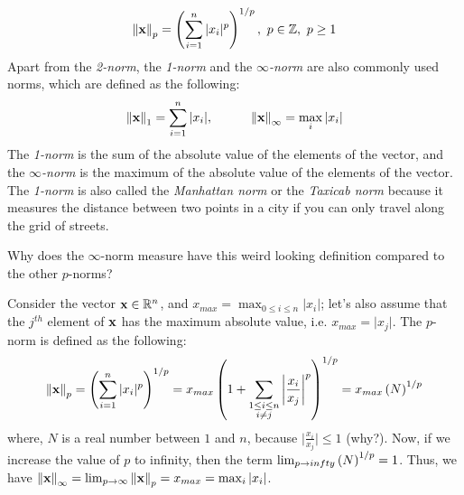 \begin{equation}
    \norm{\mathbf{x}}_p = \left( \sum_{i=1}^{n} \vert x_i \vert^p \right)^{1/p}, \,\, p \in \mathbb{Z}, \,\, p \geq 1
    \label{eq:p-norm}
\end{equation}
Apart from the \textit{2-norm}, the \textit{1-norm} and the \textit{$\infty$-norm} are also commonly used norms, which are defined as the following:
\begin{equation}
    \norm{\mathbf{x}}_1 = \sum_{i=1}^{n} \vert x_i \vert, \quad \quad \quad \norm{\mathbf{x}}_{\infty} = \max_{i} \vert x_i \vert
    \label{eq:1-infinity-norm}
\end{equation}
The \textit{1-norm} is the sum of the absolute value of the elements of the vector, and the \textit{$\infty$-norm} is the maximum of the absolute value of the elements of the vector. The \textit{1-norm} is also called the \textit{Manhattan norm} or the \textit{Taxicab norm} because it measures the distance between two points in a city if you can only travel along the grid of streets.


\begin{boxedstuff}
    \begin{problem}
        Why does the $\infty$-norm measure have this weird looking definition compared to the other $p$-norms?
        \begin{solution}
            Consider the vector $\mathbf{x} \in \mathbb{R}^n$, and $x_{max} = \max_{0 \leq i \leq n} \vert x_i \vert$; let's also assume that the $j^{th}$ element of $\mathbf{x}$ has the maximum absolute value, i.e. $x_{max} = \vert x_j \vert$. The $p$-norm is defined as the following:
            \[ \begin{split} 
                \norm{\mathbf{x}}_p &= \left( \sum_{i=1}^{n} \vert x_i \vert^p \right)^{1/p} = x_{max} \left( 1 + \sum_{\substack{1 \leq i \leq n \\ i \neq j}} \left\lvert \frac{x_i}{x_j} \right\rvert^p \right)^{1/p} = x_{max}\left( N \right)^{1/p}\\
            \end{split}
            \]
            where, $N$ is a real number between $1$ and $n$, because $\vert \frac{x_i}{x_j} \vert \leq 1$ (why?). Now, if we increase the value of $p$ to infinity, then the term $\lim_{p \to infty} \left( N \right)^{1/p}= 1$. Thus, we have $\left\lVert \mathbf{x} \right\rVert_{\infty} = \lim_{p \to \infty} \left\lVert \mathbf{x} \right\rVert_p = x_{max} = \max_{i} \left\lvert x_i \right\rvert$.
        \end{solution}
    \end{problem}
\end{boxedstuff}

